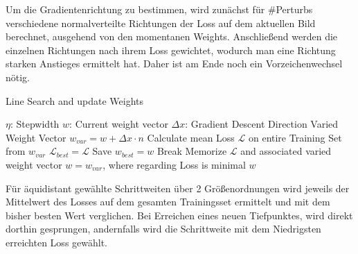 Um die Gradientenrichtung zu bestimmen, wird zunächst für \#Perturbs verschiedene normalverteilte Richtungen der Loss auf dem aktuellen Bild berechnet, ausgehend von den momentanen Weights. Anschließend werden die einzelnen Richtungen nach ihrem Loss gewichtet, wodurch man eine Richtung starken Anstieges ermittelt hat. Daher ist am Ende noch ein Vorzeichenwechsel nötig.

\vspace{1cm}


\begin{algorithm}[H]
\caption{Line Search and update Weights}\label{alg:sgd_ls}
\begin{algorithmic}[1]
	\State $\eta$: Stepwidth
	\State $w$: Current weight vector
	\State $\Delta x$: Gradient Descent Direction
	\State
		\State Varied Weight Vector $w_{var} = w + \Delta x \cdot n$
		\State Calculate mean Loss $\mathcal{L}$ on entire Training Set
		\State from $w_{var}$
			\State $\mathcal{L}_{best} = \mathcal{L}$
			\State Save $w_{best} = w$
			\State Break
		\EndIf
		\State Memorize $\mathcal{L}$ and associated varied weight vector
	\EndFor
	\State $w = w_{var}$, where regarding Loss is minimal
	\State \Return $w$
\EndProcedure
\end{algorithmic}
\end{algorithm}

\vspace{0.5cm}

Für äquidistant gewählte Schrittweiten über 2 Größenordnungen wird jeweils der Mittelwert des Losses auf dem gesamten Trainingsset ermittelt und mit dem bisher besten Wert verglichen. Bei Erreichen eines neuen Tiefpunktes, wird direkt dorthin gesprungen, andernfalls wird die Schrittweite mit dem Niedrigsten erreichten Loss gewählt.







